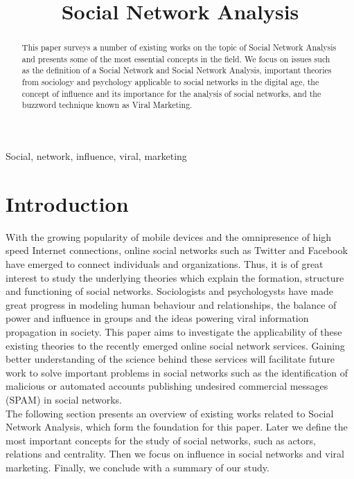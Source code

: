 \documentclass[conference,letterpaper]{IEEEtran}
\begin{document}
\title{\huge Social Network Analysis}

\author{
}

\maketitle
\begin{abstract}
This paper surveys a number of existing works on the topic of Social Network Analysis and presents some of the most essential concepts in the field. We focus on issues such as the definition of a Social Network and Social Network Analysis, important theories from sociology and psychology applicable to social networks in the digital age, the concept of influence and its importance for the analysis of social networks, and the buzzword technique known as Viral Marketing.
\\
\end{abstract}

\begin{keywords}
Social, network, influence, viral, marketing
\end{keywords}

\section{Introduction}
With the growing popularity of mobile devices and the omnipresence of high speed Internet connections, online social networks such as Twitter and Facebook have emerged to connect individuals and organizations.
Thus, it is of great interest to study the underlying theories which explain the formation, structure and functioning of social networks. Sociologists and psychologysts have made great progress in modeling human behaviour and relationships, 
the balance of power and influence in groups and the ideas powering viral information propagation in society. This paper aims to investigate the applicability of these existing theories to the recently emerged online social network services.
Gaining better understanding of the science behind these services will facilitate future work to solve important problems in social networks such as the identification of malicious or automated accounts publishing undesired commercial messages (SPAM) in social networks.\\
\indent
The following section presents an overview of existing works related to Social Network Analysis, which form the foundation for this paper. Later we define the most important concepts for the study of social networks, such as actors, relations and centrality.
Then we focus on influence in social networks and viral marketing. Finally, we conclude with a summary of our study.\\
\end{document}
